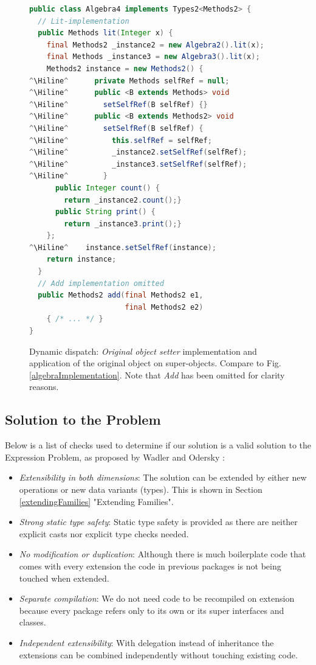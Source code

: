 \documentclass{report}
\newcommand{\Hiline}{\makebox[0pt][l]{\color[rgb]{1,0.96,0.98}\rule[-4pt]{\linewidth}{12.5pt}}}
\begin{document}
\begin{figure}[H]
\begin{lstlisting}[language=java]
public class Algebra4 implements Types2<Methods2> {
  // Lit-implementation
  public Methods lit(Integer x) {
    final Methods2 _instance2 = new Algebra2().lit(x);
    final Methods _instance3 = new Algebra3().lit(x);
    Methods2 instance = new Methods2() {
^\Hiline^      private Methods selfRef = null;
^\Hiline^      public <B extends Methods> void
^\Hiline^        setSelfRef(B selfRef) {}
^\Hiline^      public <B extends Methods2> void
^\Hiline^        setSelfRef(B selfRef) {
^\Hiline^          this.selfRef = selfRef;
^\Hiline^          _instance2.setSelfRef(selfRef);
^\Hiline^          _instance3.setSelfRef(selfRef);
^\Hiline^        }
      public Integer count() {
        return _instance2.count();}
      public String print() {
        return _instance3.print();}
    };
^\Hiline^    instance.setSelfRef(instance);
    return instance;
  }
  // Add implementation omitted
  public Methods2 add(final Methods2 e1,
                      final Methods2 e2)
    { /* ... */ }
}
\end{lstlisting}
\caption{Dynamic dispatch: \emph{Original object setter} implementation and application of the original object on super-objects. Compare to Fig. \ref{algebraImplementation}. Note that \emph{Add} has been omitted for clarity reasons.}
\label{dynamicDispatchAlgebra}
\end{figure}

\subsection{Solution to the Problem}

Below is a list of checks used to determine if our solution is a valid solution to the Expression Problem, as proposed by Wadler and Odersky \cite{Wadler-Expression-1998, Odersky-Expression-2005}:

\begin{itemize}
  \item \emph{Extensibility in both dimensions}: The solution can be extended by either new operations or new data variants (types). This is shown in Section \ref{extendingFamilies} "Extending Families".
  \item \emph{Strong static type safety}: Static type safety is provided as there are neither explicit casts nor explicit type checks needed.
  \item \emph{No modification or duplication}: Although there is much boilerplate code that comes with every extension the code in previous packages is not being touched when extended.
  \item \emph{Separate compilation}: We do not need code to be recompiled on extension because every package refers only to its own or its super interfaces and classes.
  \item \emph{Independent extensibility}: With delegation instead of inheritance the extensions can be combined independently without touching existing code.
\end{itemize}
\end{document}

